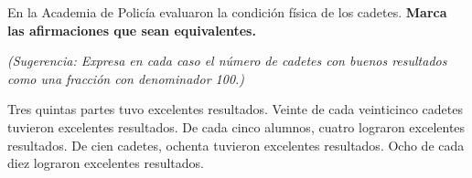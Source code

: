En la Academia de Policía evaluaron la condición física de los cadetes.
\textbf{Marca las afirmaciones que sean equivalentes.}

\emph{(Sugerencia: Expresa en cada caso el número de cadetes con buenos resultados como una fracción
    con denominador 100.)}

\begin{checkboxes}
    \choice Tres quintas partes tuvo excelentes resultados.
    \choice Veinte de cada veinticinco cadetes tuvieron excelentes resultados.
    \choice De cada cinco alumnos, cuatro lograron excelentes resultados.
    \choice De cien cadetes, ochenta tuvieron excelentes resultados.
    \choice Ocho de cada diez lograron excelentes resultados.
\end{checkboxes}
